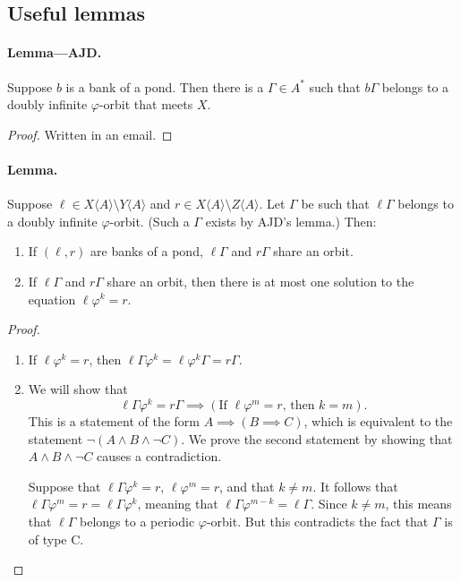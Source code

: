 \documentclass[12pt]{article}
\let\phi\varphi
\def\ofA{\langle A \rangle}
\begin{document}
\subsection{Useful lemmas}
\paragraph{Lemma---AJD.} Suppose $b$ is a bank of a pond. Then there is a $\Gamma \in A^*$ such that $b \Gamma$ belongs to a doubly infinite $\phi$-orbit that meets $X$. 
\begin{proof}Written in an email.\end{proof}

\paragraph{Lemma.} Suppose $\ell \in X\ofA \setminus Y\ofA$ and $r \in X\ofA \setminus Z\ofA$. Let $\Gamma$ be such that $\ell\Gamma$ belongs to a doubly infinite $\phi$-orbit. (Such a $\Gamma$ exists by AJD's lemma.) Then:
\begin{enumerate}
	\item \label{it:bank_test_down}
		If $(\ell, r)$ are banks of a pond, $\ell\Gamma$ and $r\Gamma$ share an orbit.
	\item \label{it:bank_test_up} 
		If $\ell\Gamma$ and $r\Gamma$ share an orbit, then there is at most one solution to the equation $\ell\phi^k = r$.
\end{enumerate}
\begin{proof}

\begin{enumerate}
	\item If $\ell\phi^k = r$, then $\ell\Gamma\phi^k = \ell \phi^k \Gamma = r \Gamma$.
	\item We will show that
	\begin{equation*}
		\ell\Gamma\phi^k = r \Gamma \implies (\text{If $\ell\phi^m = r$, then $k = m$}).
	\end{equation*}
	This is a statement of the form $A \implies (B \implies C)$, which is equivalent to the statement $\neg(A \land B \land \neg C)$. We prove the second statement by showing that $A \land B \land \neg C$ causes a contradiction.

	Suppose that $\ell\Gamma\phi^k = r$, $\ell\phi^m = r$, and that $k \neq m$. It follows that  $\ell\Gamma\phi^m = r = \ell\Gamma\phi^k$, meaning that $\ell\Gamma\phi^{m-k} = \ell \Gamma$. Since $k \neq m$, this means that $\ell\Gamma$ belongs to a periodic $\phi$-orbit. But this contradicts the fact that $\Gamma$ is of type C.
\end{enumerate}
\end{proof}
\end{document}
